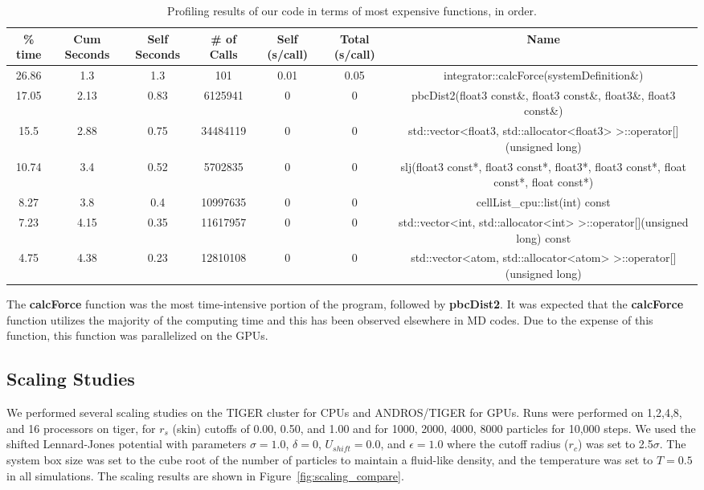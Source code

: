 \documentclass[12pt]{article}
\begin{document}
\begin{table}[htbp]
  \centering
  \tiny
  \caption{Profiling results of our code in terms of most expensive functions, in order.}
    \begin{tabular}{ccccccc}
    \toprule
    \% time & Cum Seconds & Self Seconds & \# of Calls & Self (s/call) & Total (s/call) & Name \\
    \midrule
    26.86 & 1.3   & 1.3   & 101   & 0.01  & 0.05  & integrator::calcForce(systemDefinition\&) \\
    17.05 & 2.13  & 0.83  & 6125941 & 0     & 0     & pbcDist2(float3 const\&, float3 const\&, float3\&, float3 const\&) \\
    15.5  & 2.88  & 0.75  & 34484119 & 0     & 0     & std::vector<float3, std::allocator<float3> >::operator[](unsigned long) \\
    10.74 & 3.4   & 0.52  & 5702835 & 0     & 0     & slj(float3 const*, float3 const*, float3*, float3 const*, float const*, float const*) \\
    8.27  & 3.8   & 0.4   & 10997635 & 0     & 0     & cellList\_cpu::list(int) const \\
    7.23  & 4.15  & 0.35  & 11617957 & 0     & 0     & std::vector<int, std::allocator<int> >::operator[](unsigned long) const \\
    4.75  & 4.38  & 0.23  & 12810108 & 0     & 0     & std::vector<atom, std::allocator<atom> >::operator[](unsigned long) \\
    \bottomrule
    \end{tabular}%
  \label{tab:profiling}%
\end{table}%

The \textbf{calcForce} function was the most time-intensive portion of the program, followed by \textbf{pbcDist2}. It was expected that the \textbf{calcForce} function utilizes the majority of the computing time and this has been observed elsewhere in MD codes. Due to the expense of this function, this function was parallelized on the GPUs.

\subsection{Scaling Studies}
\label{sec:scalingstudies}

We performed several scaling studies on the TIGER cluster for CPUs and ANDROS/TIGER for GPUs. Runs were performed on 1,2,4,8, and 16 processors on tiger, for $r_{s}$ (skin) cutoffs of 0.00, 0.50, and 1.00 and for 1000, 2000, 4000, 8000 particles for 10,000 steps. We used the shifted Lennard-Jones potential with parameters $\sigma = 1.0$, $\delta = 0$, $U_{shift} = 0.0$, and $\epsilon = 1.0$ where the cutoff radius ($r_c$) was set to 2.5$\sigma$.  The system box size was set to the cube root of the number of particles to maintain a fluid-like density, and the temperature was set to $T=0.5$ in all simulations.  The scaling results are shown in Figure~\ref{fig:scaling_compare}.  
\end{document}
